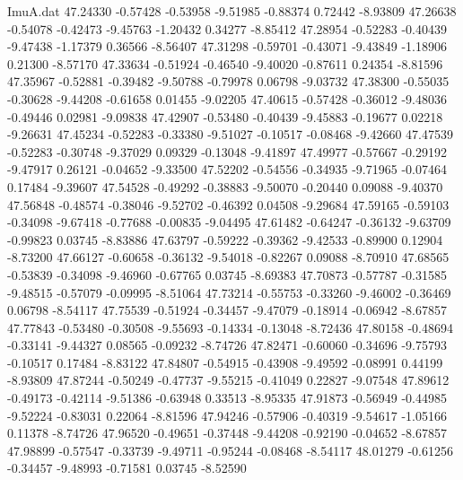 \begin{filecontents}{ImuA.dat}
  47.24330   -0.57428   -0.53958   -9.51985   -0.88374    0.72442   -8.93809
  47.26638   -0.54078   -0.42473   -9.45763   -1.20432    0.34277   -8.85412
  47.28954   -0.52283   -0.40439   -9.47438   -1.17379    0.36566   -8.56407
  47.31298   -0.59701   -0.43071   -9.43849   -1.18906    0.21300   -8.57170
  47.33634   -0.51924   -0.46540   -9.40020   -0.87611    0.24354   -8.81596
  47.35967   -0.52881   -0.39482   -9.50788   -0.79978    0.06798   -9.03732
  47.38300   -0.55035   -0.30628   -9.44208   -0.61658    0.01455   -9.02205
  47.40615   -0.57428   -0.36012   -9.48036   -0.49446    0.02981   -9.09838
  47.42907   -0.53480   -0.40439   -9.45883   -0.19677    0.02218   -9.26631
  47.45234   -0.52283   -0.33380   -9.51027   -0.10517   -0.08468   -9.42660
  47.47539   -0.52283   -0.30748   -9.37029    0.09329   -0.13048   -9.41897
  47.49977   -0.57667   -0.29192   -9.47917    0.26121   -0.04652   -9.33500
  47.52202   -0.54556   -0.34935   -9.71965   -0.07464    0.17484   -9.39607
  47.54528   -0.49292   -0.38883   -9.50070   -0.20440    0.09088   -9.40370
  47.56848   -0.48574   -0.38046   -9.52702   -0.46392    0.04508   -9.29684
  47.59165   -0.59103   -0.34098   -9.67418   -0.77688   -0.00835   -9.04495
  47.61482   -0.64247   -0.36132   -9.63709   -0.99823    0.03745   -8.83886
  47.63797   -0.59222   -0.39362   -9.42533   -0.89900    0.12904   -8.73200
  47.66127   -0.60658   -0.36132   -9.54018   -0.82267    0.09088   -8.70910
  47.68565   -0.53839   -0.34098   -9.46960   -0.67765    0.03745   -8.69383
  47.70873   -0.57787   -0.31585   -9.48515   -0.57079   -0.09995   -8.51064
  47.73214   -0.55753   -0.33260   -9.46002   -0.36469    0.06798   -8.54117
  47.75539   -0.51924   -0.34457   -9.47079   -0.18914   -0.06942   -8.67857
  47.77843   -0.53480   -0.30508   -9.55693   -0.14334   -0.13048   -8.72436
  47.80158   -0.48694   -0.33141   -9.44327    0.08565   -0.09232   -8.74726
  47.82471   -0.60060   -0.34696   -9.75793   -0.10517    0.17484   -8.83122
  47.84807   -0.54915   -0.43908   -9.49592   -0.08991    0.44199   -8.93809
  47.87244   -0.50249   -0.47737   -9.55215   -0.41049    0.22827   -9.07548
  47.89612   -0.49173   -0.42114   -9.51386   -0.63948    0.33513   -8.95335
  47.91873   -0.56949   -0.44985   -9.52224   -0.83031    0.22064   -8.81596
  47.94246   -0.57906   -0.40319   -9.54617   -1.05166    0.11378   -8.74726
  47.96520   -0.49651   -0.37448   -9.44208   -0.92190   -0.04652   -8.67857
  47.98899   -0.57547   -0.33739   -9.49711   -0.95244   -0.08468   -8.54117
  48.01279   -0.61256   -0.34457   -9.48993   -0.71581    0.03745   -8.52590

\end{filecontents}
